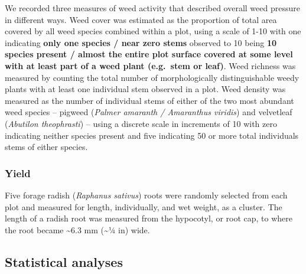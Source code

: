 \documentclass[
]{article}
\begin{document}
We recorded three measures of weed activity that described overall weed pressure in different ways.
Weed cover was estimated as the proportion of total area covered by all weed species combined within a plot, using a scale of 1-10 with one indicating \textbf{only one species / near zero stems} observed to 10 being \textbf{10 species present / almost the entire plot surface covered at some level with at least part of a weed plant (e.g.~stem or leaf)}.
Weed richness was measured by counting the total number of morphologically distinguishable weedy plants with at least one individual stem observed in a plot.
Weed density was measured as the number of individual stems of either of the two most abundant weed species -- pigweed (\emph{Palmer amaranth / Amaranthus viridis}) and velvetleaf (\emph{Abutilon theophrasti}) -- using a discrete scale in increments of 10 with zero indicating neither species present and five indicating 50 or more total individuals stems of either species.

\hypertarget{yield}{%
\subsubsection{Yield}\label{yield}}

Five forage radish (\emph{Raphanus sativus}) roots were randomly selected from each plot and measured for length, individually, and wet weight, as a cluster.
The length of a radish root was measured from the hypocotyl, or root cap, to where the root became \textasciitilde6.3 mm (\textasciitilde1⁄4 in) wide.

\hypertarget{statistical-analyses}{%
\subsection{Statistical analyses}\label{statistical-analyses}}
\end{document}
